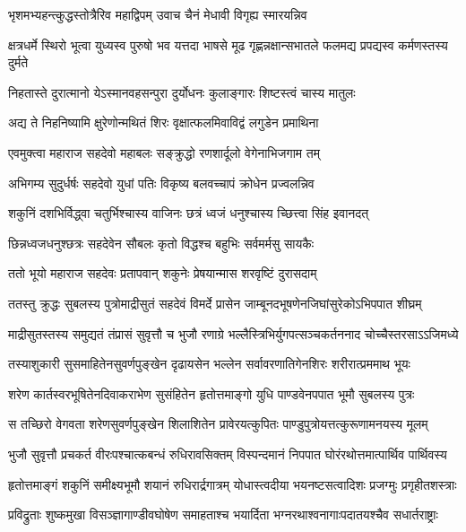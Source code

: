 \twolineshloka
{भृशमभ्यहन्त्कुद्धस्तोत्रैरिव महाद्विपम्}
{उवाच चैनं मेधावी विगृह्य स्मारयन्निव}


\threelineshloka
{क्षत्रधर्मे स्थिरो भूत्वा युध्यस्व पुरुषो भव}
{यत्तदा भाषसे मूढ गृह्णन्नक्षान्सभातले}
{फलमद्य प्रपद्यस्व कर्मणस्तस्य दुर्मते}


\twolineshloka
{निहतास्ते दुरात्मानो येऽस्मानवहसन्पुरा}
{दुर्योधनः कुलाङ्गारः शिष्टस्त्वं चास्य मातुलः}


\twolineshloka
{अद्य ते निहनिष्यामि क्षुरेणोन्मथितं शिरः}
{वृक्षात्फलमिवाविद्वं लगुडेन प्रमाथिना}


\twolineshloka
{एवमुक्त्वा महाराज सहदेवो महाबलः}
{सङ्क्रुद्धो रणशार्दूलो वेगेनाभिजगाम तम्}


\twolineshloka
{अभिगम्य सुदुर्धर्षः सहदेवो युधां पतिः}
{विकृष्य बलवच्चापं क्रोधेन प्रज्वलन्निव}


\twolineshloka
{शकुनिं दशभिर्विद्ध्वा चतुर्भिश्चास्य वाजिनः}
{छत्रं ध्वजं धनुश्चास्य च्छित्त्वा सिंह इवानदत्}


\twolineshloka
{छिन्नध्वजधनुश्छत्रः सहदेवेन सौबलः}
{कृतो विद्धश्च बहुभिः सर्वमर्मसु सायकैः}


\twolineshloka
{ततो भूयो महाराज सहदेवः प्रतापवान्}
{शकुनेः प्रेषयान्मास शरवृष्टिं दुरासदाम्}


\twolineshloka
{ततस्तु क्रुद्धः सुबलस्य पुत्रोमाद्रीसुतं सहदेवं विमर्दे}
{प्रासेन जाम्बूनदभूषणेनजिघांसुरेकोऽभिपपात शीघ्रम्}


\twolineshloka
{माद्रीसुतस्तस्य समुद्यतं तंप्रासं सुवृत्तौ च भुजौ रणाग्रे}
{भल्लैस्त्रिभिर्युगपत्सञ्चकर्तननाद चोच्चैस्तरसाऽऽजिमध्ये}


\twolineshloka
{तस्याशुकारी सुसमाहितेनसुवर्णपुङ्खेन दृढायसेन}
{भल्लेन सर्वावरणातिगेनशिरः शरीरात्प्रममाथ भूयः}


\twolineshloka
{शरेण कार्तस्वरभूषितेनदिवाकराभेण सुसंहितेन}
{हृतोत्तमाङ्गो युधि पाण्डवेनपपात भूमौ सुबलस्य पुत्रः}


\twolineshloka
{स तच्छिरो वेगवता शरेणसुवर्णपुङ्खेन शिलाशितेन}
{प्रावेरयत्कुपितः पाण्डुपुत्रोयत्तत्कुरूणामनयस्य मूलम्}


\twolineshloka
{भुजौ सुवृत्तौ प्रचकर्त वीरःपश्चात्कबन्धं रुधिरावसिक्तम्}
{विस्पन्दमानं निपपात घोरंरथोत्तमात्पार्थिव पार्थिवस्य}


\twolineshloka
{हृतोत्तमाङ्गं शकुनिं समीक्ष्यभूमौ शयानं रुधिरार्द्रगात्रम्}
{योधास्त्वदीया भयनष्टसत्वादिशः प्रजग्मुः प्रगृहीतशस्त्राः}


\twolineshloka
{प्रविद्रुताः शुष्कमुखा विसञ्ज्ञागाण्डीवघोषेण समाहताश्च}
{भयार्दिता भग्नरथाश्वनागाःपदातयश्चैव सधार्तराष्ट्राः}


